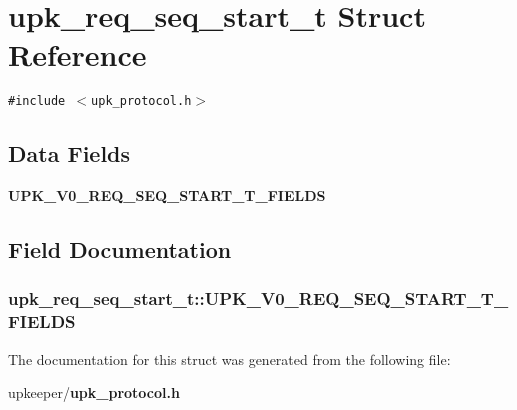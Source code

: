 \section{upk\_\-req\_\-seq\_\-start\_\-t Struct Reference}
\label{structupk__req__seq__start__t}
{\tt \#include $<$upk\_\-protocol.h$>$}

\subsection*{Data Fields}
\begin{CompactItemize}
\item 
\bf{UPK\_\-V0\_\-REQ\_\-SEQ\_\-START\_\-T\_\-FIELDS}
\end{CompactItemize}


\subsection{Field Documentation}
\subsubsection{\setlength{\rightskip}{0pt plus 5cm}\bf{upk\_\-req\_\-seq\_\-start\_\-t::UPK\_\-V0\_\-REQ\_\-SEQ\_\-START\_\-T\_\-FIELDS}}\label{structupk__req__seq__start__t_13389f6aafe5c7665276e75c38c42fca}




The documentation for this struct was generated from the following file:\begin{CompactItemize}
\item 
upkeeper/\bf{upk\_\-protocol.h}\end{CompactItemize}
